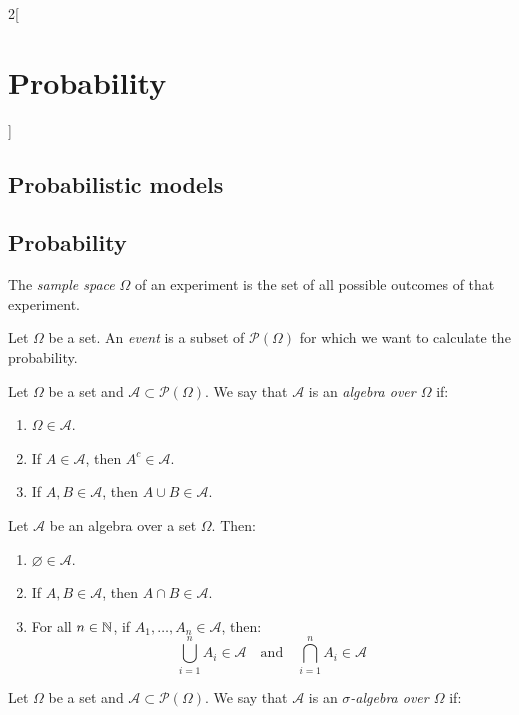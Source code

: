 \documentclass[../../../main.tex]{subfiles}
\begin{document}
\begin{multicols}{2}[\section{Probability}]
  \subsection{Probabilistic models}
  \subsection*{Probability}
  \begin{definition}
    The \textit{sample space} $\Omega$ of an experiment is the set of all possible outcomes of that experiment.
  \end{definition}
  \begin{definition}
    Let $\Omega$ be a set. An \textit{event} is a subset of $\mathcal{P}(\Omega)$ for which we want to calculate the probability.
  \end{definition}
  \begin{definition}
    Let $\Omega$ be a set and $\mathcal{A}\subset\mathcal{P}(\Omega)$. We say that $\mathcal{A}$ is an \textit{algebra over $\Omega$} if:
    \begin{enumerate}
      \item $\Omega\in\mathcal{A}$.
      \item If $A\in\mathcal{A}$, then $A^c\in\mathcal{A}$.
      \item If $A,B\in\mathcal{A}$, then $A\cup B\in\mathcal{A}$.
    \end{enumerate}
  \end{definition}
  \begin{prop}
    Let $\mathcal{A}$ be an algebra over a set $\Omega$. Then:
    \begin{enumerate}
      \item $\varnothing\in\mathcal{A}$.
      \item If $A,B\in\mathcal{A}$, then $A\cap B\in\mathcal{A}$.
      \item For all $n\in\mathbb{N}$, if $A_1,\ldots,A_n\in\mathcal{A}$, then: $$\bigcup_{i=1}^nA_i\in\mathcal{A}\quad\text{and}\quad\bigcap_{i=1}^nA_i\in\mathcal{A}$$
    \end{enumerate}
  \end{prop}
  \begin{definition}
    Let $\Omega$ be a set and $\mathcal{A}\subset\mathcal{P}(\Omega)$. We say that $\mathcal{A}$ is an \textit{$\sigma$-algebra over $\Omega$} if:

\end{definition}
\end{multicols}
\end{document}
